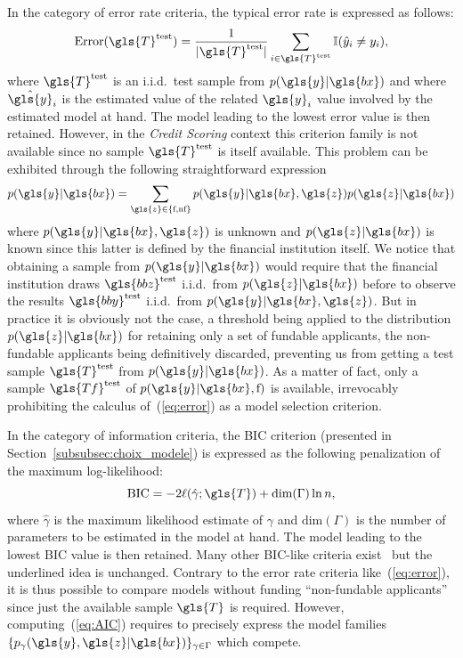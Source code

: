 In the category of error rate criteria, the typical error rate is expressed as follows:
\begin{equation} \label{eq:error}
\mbox{Error}(\gls{T}^\text{test}) = \frac{1}{|\gls{T}^\text{test}|} \sum_{i \in \gls{T}^\text{test}} \mathbb{I}(\hat y_i \neq y_i),
\end{equation} 
where $\gls{T}^\text{test}$ is an i.i.d.\ test sample from $p(\gls{y}|\gls{bx})$ and where $\hat{\gls{y}}_i$ is the estimated value of the related $\gls{y}_i$ value involved by the estimated model at hand. The model leading to the lowest error value is then retained. However, in the \textit{Credit Scoring} context this criterion family is not available since no sample $\gls{T}^\text{test}$ is itself available. This problem can be exhibited through the following straightforward expression
\begin{equation} \label{eq:error2}
p(\gls{y}|\gls{bx}) = \sum_{\gls{z}\in\{\text{f},\text{nf}\}} p(\gls{y}|\gls{bx},\gls{z}) p(\gls{z}|\gls{bx})
\end{equation}
where $p(\gls{y}|\gls{bx},\gls{z})$ is unknown and $p(\gls{z}|\gls{bx})$ is known since this latter is defined by the financial institution itself. We notice that obtaining a sample from $p(\gls{y}|\gls{bx})$ would require that the financial institution draws $\gls{bbz}^\text{test}$ i.i.d.\ from $p(\gls{z}|\gls{bx})$ before to observe the results $\gls{bby}^\text{test}$ i.i.d.\ from $p(\gls{y}|\gls{bx},\gls{z})$. But in practice it is obviously not the case, a threshold being applied to the distribution $p(\gls{z}|\gls{bx})$ for retaining only a set of fundable applicants, the non-fundable applicants being definitively discarded, preventing us from getting a test sample $\gls{T}^\text{test}$ from $p(\gls{y} | \gls{bx})$. As a matter of fact, only a sample $\gls{Tf}^\text{test}$ of $p(\gls{y}|\gls{bx},\text{f})$ is available, 
irrevocably prohibiting the calculus of~(\ref{eq:error}) as a model selection criterion.

In the category of information criteria, the BIC criterion (presented in Section~\ref{subsubsec:choix_modele}) is expressed as the following penalization of the maximum log-likelihood:
\begin{equation}\label{eq:AIC}
\mbox{BIC} = - 2 \ell(\hat\gamma;\gls{T}) + \text{dim}(\Gamma) \ln n,
\end{equation}
where $\hat\gamma$ is the maximum likelihood estimate of $\gamma$ and $\text{dim}(\Gamma)$ is the number of parameters to be estimated in the model at hand. The model leading to the lowest BIC value is then retained. Many other BIC-like criteria exist~\cite{vandewalle:tel-00447141} but the underlined idea is unchanged. Contrary to the error rate criteria like~(\ref{eq:error}), it is thus possible to compare models without funding ``non-fundable applicants'' since just the available sample $\gls{T}$ is required. However, computing~(\ref{eq:AIC}) requires to precisely express the model families $\{p_{\gamma}(\gls{y},\gls{z}|\gls{bx})\}_{\gamma \in \Gamma}$ which compete.


